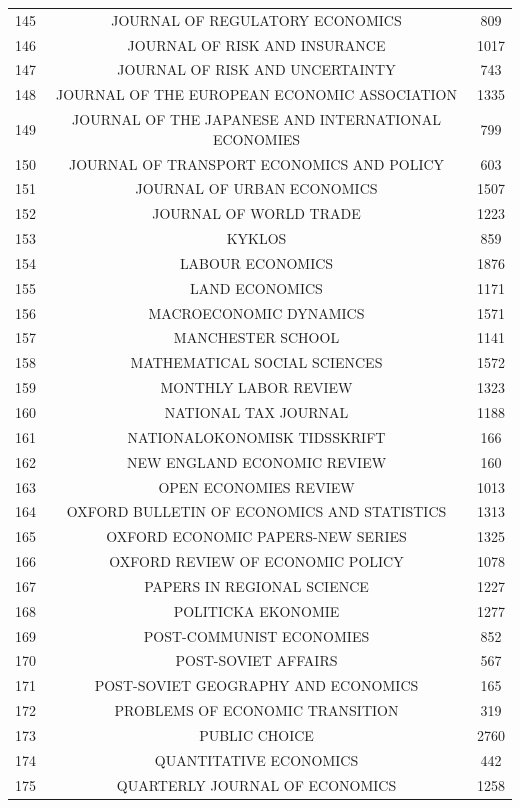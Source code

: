 \begin{tabular}{@{\extracolsep{5pt}} ccc}
145 & JOURNAL OF REGULATORY ECONOMICS & 809 \\ 
146 & JOURNAL OF RISK AND INSURANCE & 1017 \\ 
147 & JOURNAL OF RISK AND UNCERTAINTY & 743 \\ 
148 & JOURNAL OF THE EUROPEAN ECONOMIC ASSOCIATION & 1335 \\ 
149 & JOURNAL OF THE JAPANESE AND INTERNATIONAL ECONOMIES & 799 \\ 
150 & JOURNAL OF TRANSPORT ECONOMICS AND POLICY & 603 \\ 
151 & JOURNAL OF URBAN ECONOMICS & 1507 \\ 
152 & JOURNAL OF WORLD TRADE & 1223 \\ 
153 & KYKLOS & 859 \\ 
154 & LABOUR ECONOMICS & 1876 \\ 
155 & LAND ECONOMICS & 1171 \\ 
156 & MACROECONOMIC DYNAMICS & 1571 \\ 
157 & MANCHESTER SCHOOL & 1141 \\ 
158 & MATHEMATICAL SOCIAL SCIENCES & 1572 \\ 
159 & MONTHLY LABOR REVIEW & 1323 \\ 
160 & NATIONAL TAX JOURNAL & 1188 \\ 
161 & NATIONALOKONOMISK TIDSSKRIFT & 166 \\ 
162 & NEW ENGLAND ECONOMIC REVIEW & 160 \\ 
163 & OPEN ECONOMIES REVIEW & 1013 \\ 
164 & OXFORD BULLETIN OF ECONOMICS AND STATISTICS & 1313 \\ 
165 & OXFORD ECONOMIC PAPERS-NEW SERIES & 1325 \\ 
166 & OXFORD REVIEW OF ECONOMIC POLICY & 1078 \\ 
167 & PAPERS IN REGIONAL SCIENCE & 1227 \\ 
168 & POLITICKA EKONOMIE & 1277 \\ 
169 & POST-COMMUNIST ECONOMIES & 852 \\ 
170 & POST-SOVIET AFFAIRS & 567 \\ 
171 & POST-SOVIET GEOGRAPHY AND ECONOMICS & 165 \\ 
172 & PROBLEMS OF ECONOMIC TRANSITION & 319 \\ 
173 & PUBLIC CHOICE & 2760 \\ 
174 & QUANTITATIVE ECONOMICS & 442 \\ 
175 & QUARTERLY JOURNAL OF ECONOMICS & 1258 \\ 

\end{tabular}
